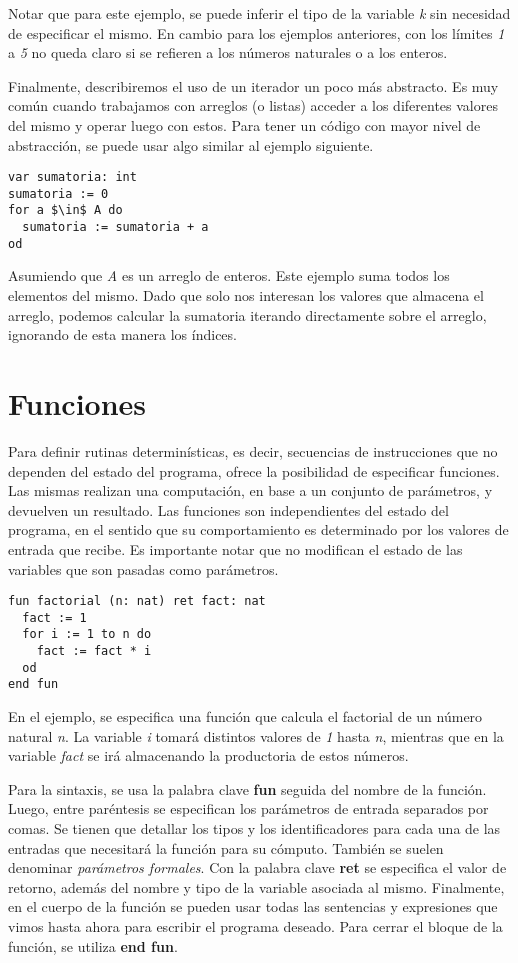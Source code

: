 \documentclass{article}
\begin{document}
Notar que para este ejemplo, se puede inferir el tipo de la variable \textit{k} sin necesidad de especificar el mismo.
En cambio para los ejemplos anteriores, con los límites \textit{1} a \textit{5} no queda claro si se refieren a los números naturales o a los enteros.

Finalmente, describiremos el uso de un iterador un poco más abstracto.
Es muy común cuando trabajamos con arreglos (o listas) acceder a los diferentes valores del mismo y operar luego con estos.
Para tener un código con mayor nivel de abstracción, se puede usar algo similar al ejemplo siguiente.

\begin{lstlisting}
var sumatoria: int
sumatoria := 0
for a $\in$ A do
  sumatoria := sumatoria + a
od
\end{lstlisting}

Asumiendo que \textit{A} es un arreglo de enteros.
Este ejemplo suma todos los elementos del mismo.
Dado que solo nos interesan los valores que almacena el arreglo, podemos calcular la sumatoria iterando directamente sobre el arreglo, ignorando de esta manera los índices.

\section{Funciones}

Para definir rutinas determinísticas, es decir, secuencias de instrucciones que no dependen del estado del programa, \Lang\space ofrece la posibilidad de especificar funciones.
Las mismas realizan una computación, en base a un conjunto de parámetros, y devuelven un resultado.
Las funciones son independientes del estado del programa, en el sentido que su comportamiento es determinado por los valores de entrada que recibe.
Es importante notar que no modifican el estado de las variables que son pasadas como parámetros.

\begin{lstlisting}
fun factorial (n: nat) ret fact: nat
  fact := 1
  for i := 1 to n do
    fact := fact * i
  od
end fun
\end{lstlisting}

En el ejemplo, se especifica una función que calcula el factorial de un número natural \textit{n}.
La variable \textit{i} tomará distintos valores de \textit{1} hasta \textit{n}, mientras que en la variable \textit{fact} se irá almacenando la productoria de estos números.

Para la sintaxis, se usa la palabra clave \textbf{fun} seguida del nombre de la función.
Luego, entre paréntesis se especifican los parámetros de entrada separados por comas.
Se tienen que detallar los tipos y los identificadores para cada una de las entradas que necesitará la función para su cómputo.
También se suelen denominar \textit{parámetros formales}.
Con la palabra clave \textbf{ret} se especifica el valor de retorno, además del nombre y tipo de la variable asociada al mismo.
Finalmente, en el cuerpo de la función se pueden usar todas las sentencias y expresiones que vimos hasta ahora para escribir el programa deseado.
Para cerrar el bloque de la función, se utiliza \textbf{end fun}.
\end{document}

